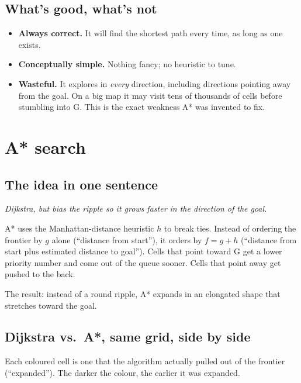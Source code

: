 \documentclass[11pt,a4paper]{article}
\begin{document}
\subsection{What's good, what's not}

\begin{itemize}[leftmargin=20pt,itemsep=2pt]
  \item[\textcolor{accent}{\textbf{+}}] \textbf{Always correct.} It will find the shortest path every time, as long as one exists.
  \item[\textcolor{accent}{\textbf{+}}] \textbf{Conceptually simple.} Nothing fancy; no heuristic to tune.
  \item[\textcolor{accent2}{\textbf{--}}] \textbf{Wasteful.} It explores in \emph{every} direction, including directions pointing away from the goal. On a big map it may visit tens of thousands of cells before stumbling into G. This is the exact weakness A* was invented to fix.
\end{itemize}

\clearpage
\section{A* search}\label{sec:astar}

\subsection{The idea in one sentence}

\emph{Dijkstra, but bias the ripple so it grows faster in the direction of the goal.}

A* uses the Manhattan-distance heuristic $h$ to break ties. Instead of ordering the frontier by $g$ alone (``distance from start''), it orders by $f = g + h$ (``distance from start plus estimated distance to goal''). Cells that point toward G get a lower priority number and come out of the queue sooner. Cells that point away get pushed to the back.

The result: instead of a round ripple, A* expands in an elongated shape that stretches toward the goal.

\subsection{Dijkstra vs.\ A*, same grid, side by side}

Each coloured cell is one that the algorithm actually pulled out of the frontier (``expanded''). The darker the colour, the earlier it was expanded.
\end{document}
